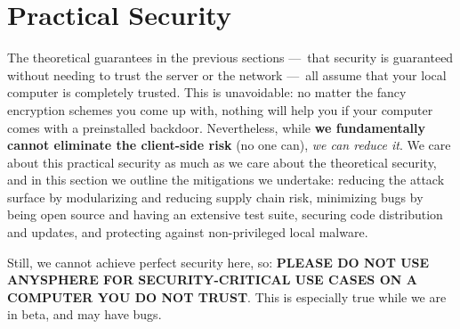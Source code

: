 \section{Practical Security}

The theoretical guarantees in the previous sections — that security is guaranteed without needing to trust
the server or the network — all assume that your local computer is completely trusted. This is unavoidable: no matter the fancy encryption schemes you come up with, nothing will help you if your computer comes with a preinstalled backdoor. Nevertheless, while \textbf{we fundamentally cannot eliminate the client-side risk} (no one can), \textit{we can reduce it}. We care about this practical security as much as we care about the theoretical security, and in this section we outline the mitigations we undertake: reducing the attack surface by modularizing and reducing supply chain risk, minimizing bugs by being open source and having an extensive test suite, securing code distribution and updates, and protecting against non-privileged local malware.

Still, we cannot achieve perfect security here, so: \textbf{PLEASE DO NOT USE ANYSPHERE FOR SECURITY-CRITICAL USE CASES ON A COMPUTER YOU DO NOT TRUST}. This is especially true while we are in beta, and may have bugs.




